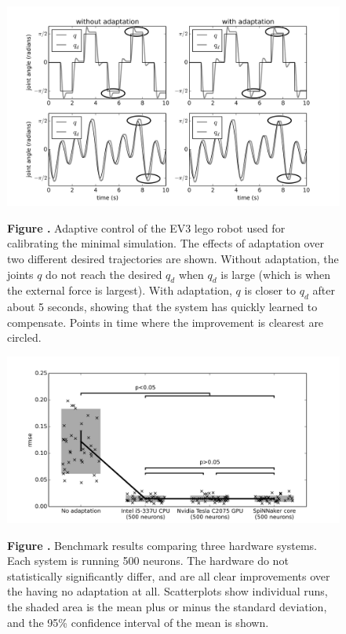 \documentclass{frontiersSCNS} %
\begin{document}
\begin{figure}[h!]
\begin{center}
\includegraphics[width=18cm]{figures/fig_ev3}
\end{center}
 \textbf{\label{fig:ev3} Figure .}{ Adaptive control of the EV3 lego robot used for calibrating the minimal simulation.
 The effects of adaptation over two different desired trajectories are shown.  Without adaptation, the joints $q$ do not reach the desired $q_d$ when $q_d$ is large (which
 is when the external force is largest).  With adaptation, $q$ is closer to $q_d$ after about 5 seconds, showing that the system has quickly learned to compensate.
 Points in time where the improvement is clearest are circled.}
\end{figure}

\begin{figure}[h!]
\begin{center}
\includegraphics[width=18cm]{figures/plot_basic}
\end{center}
 \textbf{\label{fig:analysis_basic} Figure .}{ Benchmark results comparing three hardware systems.
     Each system is running 500 neurons.  The hardware do not statistically
     significantly differ, and are all clear improvements over the having
     no adaptation at all.
     Scatterplots show individual runs, the 
     shaded area is the mean plus or minus the standard deviation, and the 95\% confidence interval of the mean is shown.}
\end{figure}
\end{document}

